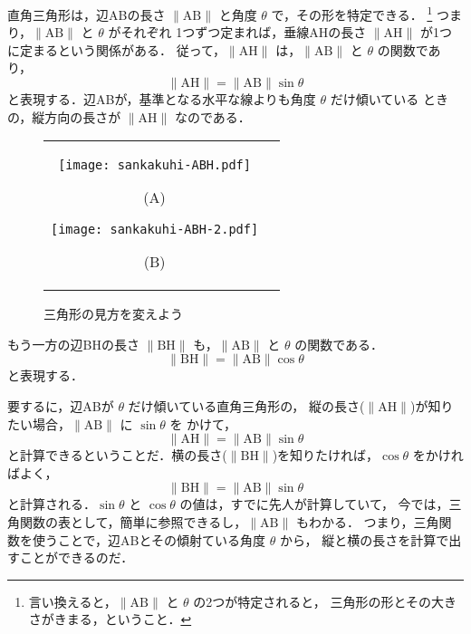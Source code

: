     直角三角形は，辺ABの長さ $\|\mathrm{AB}\|$ と角度 $\theta$ で，その形を特定できる．
        \footnote{
            言い換えると，$\|\mathrm{AB}\|$ と $\theta$ の2つが特定されると，
            三角形の形とその大きさがきまる，ということ．
        }
    つまり，$\|\mathrm{AB}\|$ と $\theta$ がそれぞれ
    1つずつ定まれば，垂線AHの長さ $\|\mathrm{AH}\|$ が1つに定まるという関係がある．
    従って，$\|\mathrm{AH}\|$ は，$\|\mathrm{AB}\|$ と $\theta$ の関数であり，
        \begin{equation*}
            \|\mathrm{AH}\| = \|\mathrm{AB}\|\sin \theta
        \end{equation*}
    と表現する．辺ABが，基準となる水平な線よりも角度 $\theta$ だけ傾いている
    ときの，縦方向の長さが $\|\mathrm{AH}\|$ なのである．
    \begin{figure}[hbt]
        \begin{tabular}{cc}
            \begin{minipage}{0.5\hsize}
            \begin{center}
                \texttt{[image: sankakuhi-ABH.pdf]}

                (A)
            \end{center}
            \end{minipage}
            \begin{minipage}{0.5\hsize}
            \begin{center}
                \texttt{[image: sankakuhi-ABH-2.pdf]}

                (B)
            \end{center}
            \end{minipage}
        \end{tabular}
        \caption{三角形の見方を変えよう}
        \label{fig:sankakukei-no-mikata}
    \end{figure}

    もう一方の辺BHの長さ $\|\mathrm{BH}\|$ も，$\|\mathrm{AB}\|$ と $\theta$ の関数である．
        \begin{equation*}
            \|\mathrm{BH}\| = \|\mathrm{AB}\|\cos \theta
        \end{equation*}
    と表現する．

    要するに，辺ABが $\theta$ だけ傾いている直角三角形の，
    縦の長さ($\|\mathrm{AH}\|$)が知りたい場合，$\|\mathrm{AB}\|$ に $\sin \theta$ を
    かけて，
        \begin{equation*}
            \|\mathrm{AH}\| = \|\mathrm{AB}\| \sin \theta
        \end{equation*}
    と計算できるということだ．横の長さ($\|\mathrm{BH}\|$)を知りたければ，$\cos \theta$ をかければよく，
        \begin{equation*}
            \|\mathrm{BH}\| = \|\mathrm{AB}\| \sin \theta
        \end{equation*}
    と計算される．$\sin \theta$ と $\cos \theta$ の値は，すでに先人が計算していて，
    今では，三角関数の表として，簡単に参照できるし，$\|\mathrm{AB}\|$ もわかる．
    つまり，三角関数を使うことで，辺ABとその傾射ている角度 $\theta$ から，
    縦と横の長さを計算で出すことができるのだ．

